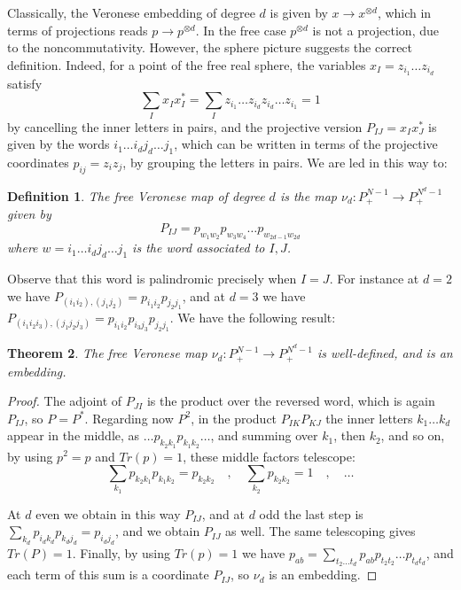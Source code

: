 \documentclass[11pt]{article}
\theoremstyle{plain}
\newtheorem{theorem}{Theorem}[section]
\newtheorem{definition}[theorem]{Definition}
\begin{document}
Classically, the Veronese embedding of degree $d$ is given by $x\to x^{\otimes d}$, which in terms of projections reads $p\to p^{\otimes d}$. In the free case $p^{\otimes d}$ is not a projection, due to the noncommutativity. However, the sphere picture suggests the correct definition. Indeed, for a point of the free real sphere, the variables $x_I=z_{i_1}\ldots z_{i_d}$ satisfy
$$\sum_Ix_Ix_I^*=\sum_Iz_{i_1}\ldots z_{i_d}z_{i_d}\ldots z_{i_1}=1$$
by cancelling the inner letters in pairs, and the projective version $P_{IJ}=x_Ix_J^*$ is given by the words $i_1\ldots i_dj_d\ldots j_1$, which can be written in terms of the projective coordinates $p_{ij}=z_iz_j$, by grouping the letters in pairs. We are led in this way to:

\begin{definition}
The free Veronese map of degree $d$ is the map $\nu_d:P^{N-1}_+\to P^{N^d-1}_+$ given by
$$P_{IJ}=p_{w_1w_2}p_{w_3w_4}\ldots p_{w_{2d-1}w_{2d}}$$
where $w=i_1\ldots i_dj_d\ldots j_1$ is the word associated to $I,J$.
\end{definition}

Observe that this word is palindromic precisely when $I=J$. For instance at $d=2$ we have $P_{(i_1i_2),(j_1j_2)}=p_{i_1i_2}p_{j_2j_1}$, and at $d=3$ we have $P_{(i_1i_2i_3),(j_1j_2j_3)}=p_{i_1i_2}p_{i_3j_3}p_{j_2j_1}$. We have the following result:

\begin{theorem}
\label{thm:veronese}
The free Veronese map $\nu_d:P^{N-1}_+\to P^{N^d-1}_+$ is well-defined, and is an embedding.
\end{theorem}

\begin{proof}
The adjoint of $P_{JI}$ is the product over the reversed word, which is again $P_{IJ}$, so $P=P^*$. Regarding now $P^2$, in the product $P_{IK}P_{KJ}$ the inner letters $k_1\ldots k_d$ appear in the middle, as $\ldots p_{k_2k_1}p_{k_1k_2}\ldots$, and summing over $k_1$, then $k_2$, and so on, by using $p^2=p$ and $Tr(p)=1$, these middle factors telescope:
$$\sum_{k_1}p_{k_2k_1}p_{k_1k_2}=p_{k_2k_2}\quad,\quad\sum_{k_2}p_{k_2k_2}=1\quad,\quad\ldots$$

At $d$ even we obtain in this way $P_{IJ}$, and at $d$ odd the last step is $\sum_{k_d}p_{i_dk_d}p_{k_dj_d}=p_{i_dj_d}$, and we obtain $P_{IJ}$ as well. The same telescoping gives $Tr(P)=1$. Finally, by using $Tr(p)=1$ we have $p_{ab}=\sum_{t_2\ldots t_d}p_{ab}p_{t_2t_2}\ldots p_{t_dt_d}$, and each term of this sum is a coordinate $P_{IJ}$, so $\nu_d$ is an embedding.
\end{proof}
\end{document}
